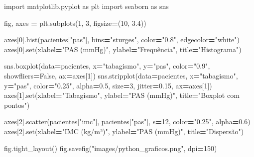 \documentclass[
]{book}
\newenvironment{Shaded}{\begin{snugshade}}{\end{snugshade}}
\newcommand{\BuiltInTok}[1]{#1}
\newcommand{\DecValTok}[1]{\textcolor[rgb]{0.00,0.00,0.81}{#1}}
\newcommand{\FloatTok}[1]{\textcolor[rgb]{0.00,0.00,0.81}{#1}}
\newcommand{\ImportTok}[1]{#1}
\newcommand{\NormalTok}[1]{#1}
\newcommand{\OperatorTok}[1]{\textcolor[rgb]{0.81,0.36,0.00}{\textbf{#1}}}
\newcommand{\StringTok}[1]{\textcolor[rgb]{0.31,0.60,0.02}{#1}}
\newcommand{\VariableTok}[1]{\textcolor[rgb]{0.00,0.00,0.00}{#1}}
\begin{document}
\begin{Shaded}
\begin{Highlighting}[]
\ImportTok{import}\NormalTok{ matplotlib.pyplot }\ImportTok{as}\NormalTok{ plt}
\ImportTok{import}\NormalTok{ seaborn }\ImportTok{as}\NormalTok{ sns}

\NormalTok{fig, axes }\OperatorTok{=}\NormalTok{ plt.subplots(}\DecValTok{1}\NormalTok{, }\DecValTok{3}\NormalTok{, figsize}\OperatorTok{=}\NormalTok{(}\DecValTok{10}\NormalTok{, }\FloatTok{3.4}\NormalTok{))}

\NormalTok{axes[}\DecValTok{0}\NormalTok{].hist(pacientes[}\StringTok{"pas"}\NormalTok{], bins}\OperatorTok{=}\StringTok{"sturges"}\NormalTok{, color}\OperatorTok{=}\StringTok{"0.8"}\NormalTok{, edgecolor}\OperatorTok{=}\StringTok{"white"}\NormalTok{)}
\NormalTok{axes[}\DecValTok{0}\NormalTok{].}\BuiltInTok{set}\NormalTok{(xlabel}\OperatorTok{=}\StringTok{"PAS (mmHg)"}\NormalTok{, ylabel}\OperatorTok{=}\StringTok{"Frequência"}\NormalTok{, title}\OperatorTok{=}\StringTok{"Histograma"}\NormalTok{)}

\NormalTok{sns.boxplot(data}\OperatorTok{=}\NormalTok{pacientes, x}\OperatorTok{=}\StringTok{"tabagismo"}\NormalTok{, y}\OperatorTok{=}\StringTok{"pas"}\NormalTok{, color}\OperatorTok{=}\StringTok{"0.9"}\NormalTok{, showfliers}\OperatorTok{=}\VariableTok{False}\NormalTok{, ax}\OperatorTok{=}\NormalTok{axes[}\DecValTok{1}\NormalTok{])}
\NormalTok{sns.stripplot(data}\OperatorTok{=}\NormalTok{pacientes, x}\OperatorTok{=}\StringTok{"tabagismo"}\NormalTok{, y}\OperatorTok{=}\StringTok{"pas"}\NormalTok{, color}\OperatorTok{=}\StringTok{"0.25"}\NormalTok{, alpha}\OperatorTok{=}\FloatTok{0.5}\NormalTok{,}
\NormalTok{              size}\OperatorTok{=}\DecValTok{3}\NormalTok{, jitter}\OperatorTok{=}\FloatTok{0.15}\NormalTok{, ax}\OperatorTok{=}\NormalTok{axes[}\DecValTok{1}\NormalTok{])}
\NormalTok{axes[}\DecValTok{1}\NormalTok{].}\BuiltInTok{set}\NormalTok{(xlabel}\OperatorTok{=}\StringTok{"Tabagismo"}\NormalTok{, ylabel}\OperatorTok{=}\StringTok{"PAS (mmHg)"}\NormalTok{, title}\OperatorTok{=}\StringTok{"Boxplot com pontos"}\NormalTok{)}

\NormalTok{axes[}\DecValTok{2}\NormalTok{].scatter(pacientes[}\StringTok{"imc"}\NormalTok{], pacientes[}\StringTok{"pas"}\NormalTok{], s}\OperatorTok{=}\DecValTok{12}\NormalTok{, color}\OperatorTok{=}\StringTok{"0.25"}\NormalTok{, alpha}\OperatorTok{=}\FloatTok{0.6}\NormalTok{)}
\NormalTok{axes[}\DecValTok{2}\NormalTok{].}\BuiltInTok{set}\NormalTok{(xlabel}\OperatorTok{=}\StringTok{"IMC (kg/m²)"}\NormalTok{, ylabel}\OperatorTok{=}\StringTok{"PAS (mmHg)"}\NormalTok{, title}\OperatorTok{=}\StringTok{"Dispersão"}\NormalTok{)}

\NormalTok{fig.tight\_layout()}
\NormalTok{fig.savefig(}\StringTok{"images/python\_graficos.png"}\NormalTok{, dpi}\OperatorTok{=}\DecValTok{150}\NormalTok{)}
\end{Highlighting}
\end{Shaded}
\end{document}
